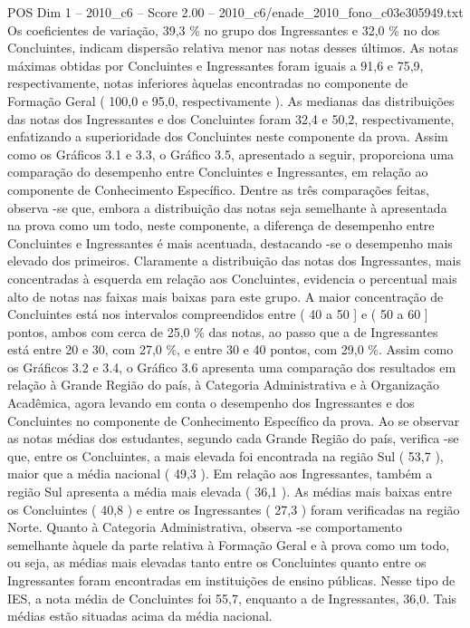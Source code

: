 \begin{textsample}{POS Dim 1 – 2010\_c6 – Score 2.00 – 2010\_c6/enade\_2010\_fono\_c03e305949.txt}
Os coeficientes de variação, 39,3 \% no grupo dos Ingressantes e 32,0 \% no dos Concluintes, indicam dispersão relativa menor nas notas desses últimos.
As notas máximas obtidas por Concluintes e Ingressantes foram iguais a 91,6 e 75,9, respectivamente, notas inferiores àquelas encontradas no componente de Formação Geral ( 100,0 e 95,0, respectivamente ).
As medianas das distribuições das notas dos Ingressantes e dos Concluintes foram 32,4 e 50,2, respectivamente, enfatizando a superioridade dos Concluintes neste componente da prova.
Assim como os Gráficos 3.1 e 3.3, o Gráfico 3.5, apresentado a seguir, proporciona uma comparação do desempenho entre Concluintes e Ingressantes, em relação ao componente de Conhecimento Específico.
Dentre as três comparações feitas, observa -se que, embora a distribuição das notas seja semelhante à apresentada na prova como um todo, neste componente, a diferença de desempenho entre Concluintes e Ingressantes é mais acentuada, destacando -se o desempenho mais elevado dos primeiros.
Claramente a distribuição das notas dos Ingressantes, mais concentradas à esquerda em relação aos Concluintes, evidencia o percentual mais alto de notas nas faixas mais baixas para este grupo.
A maior concentração de Concluintes está nos intervalos compreendidos entre ( 40 a 50 ] e ( 50 a 60 ] pontos, ambos com cerca de 25,0 \% das notas, ao passo que a de Ingressantes está entre 20 e 30, com 27,0 \%, e entre 30 e 40 pontos, com 29,0 \%.
Assim como os Gráficos 3.2 e 3.4, o Gráfico 3.6 apresenta uma comparação dos resultados em relação à Grande Região do país, à Categoria Administrativa e à Organização Acadêmica, agora levando em conta o desempenho dos Ingressantes e dos Concluintes no componente de Conhecimento Específico da prova.
Ao se observar as notas médias dos estudantes, segundo cada Grande Região do país, verifica -se que, entre os Concluintes, a mais elevada foi encontrada na região Sul ( 53,7 ), maior que a média nacional ( 49,3 ).
Em relação aos Ingressantes, também a região Sul apresenta a média mais elevada ( 36,1 ).
As médias mais baixas entre os Concluintes ( 40,8 ) e entre os Ingressantes ( 27,3 ) foram verificadas na região Norte.
Quanto à Categoria Administrativa, observa -se comportamento semelhante àquele da parte relativa à Formação Geral e à prova como um todo, ou seja, as médias mais elevadas tanto entre os Concluintes quanto entre os Ingressantes foram encontradas em instituições de ensino públicas.
Nesse tipo de IES, a nota média de Concluintes foi 55,7, enquanto a de Ingressantes, 36,0.
Tais médias estão situadas acima da média nacional.

\end{textsample}
